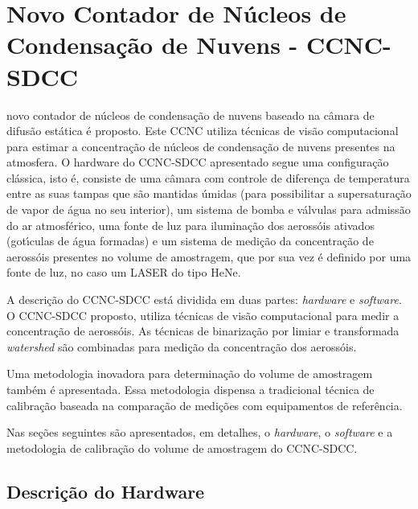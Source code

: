 \chapter{Novo Contador de N\'{u}cleos de Condensa\c{c}\~{a}o de Nuvens  - CCNC-SDCC }
\label{cap:metodologia}

 novo contador de n\'{u}cleos de condensa\c{c}\~{a}o de nuvens baseado na c\^{a}mara de difus\~{a}o est\'{a}tica \'{e} proposto. Este  CCNC utiliza t\'{e}cnicas de vis\~{a}o computacional para estimar a concentra\c{c}\~{a}o de n\'{u}cleos de condensa\c{c}\~{a}o de nuvens presentes na atmosfera. O hardware do CCNC-SDCC apresentado segue uma configura\c{c}\~{a}o cl\'{a}ssica, isto \'{e}, consiste de uma c\^{a}mara com controle de diferen\c{c}a de temperatura entre as suas tampas que s\~{a}o mantidas \'{u}midas (para possibilitar a supersatura\c{c}\~{a}o de vapor de \'{a}gua no seu interior), um sistema de bomba e v\'{a}lvulas para admiss\~{a}o do ar atmosf\'{e}rico, uma fonte de luz para ilumina\c{c}\~{a}o dos aeross\'{o}is ativados (got\'{\i}culas de \'{a}gua formadas) e um sistema de medi\c{c}\~{a}o da concentra\c{c}\~{a}o de aeross\'{o}is presentes no volume de amostragem, que por sua vez \'{e} definido por uma fonte de luz, no caso um LASER do tipo HeNe.

A descri\c{c}\~{a}o do CCNC-SDCC est\'{a} dividida em duas partes: \emph{hardware} e \emph{software}. O CCNC-SDCC proposto, utiliza t\'{e}cnicas de vis\~{a}o computacional para medir a concentra\c{c}\~{a}o de aeross\'{o}is. As t\'{e}cnicas de binariza\c{c}\~{a}o por limiar e transformada \emph{watershed} s\~{a}o combinadas para medi\c{c}\~{a}o da concentra\c{c}\~{a}o dos aeross\'{o}is.

Uma metodologia inovadora para determina\c{c}\~{a}o do volume de amostragem tamb\'{e}m \'{e} apresentada. Essa metodologia dispensa a tradicional t\'{e}cnica de calibra\c{c}\~{a}o baseada na compara\c{c}\~{a}o de medi\c{c}\~{o}es com equipamentos de refer\^{e}ncia.

Nas se\c{c}\~{o}es seguintes s\~{a}o apresentados, em detalhes, o \emph{hardware}, o \emph{software}  e a metodologia de calibra\c{c}\~{a}o do volume de amostragem do CCNC-SDCC.

\section{Descri\c{c}\~{a}o do Hardware}

